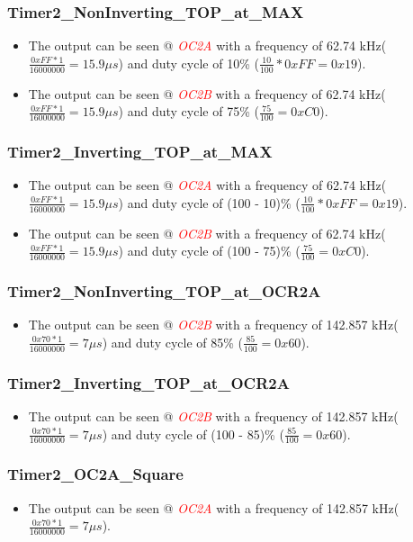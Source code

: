 \documentclass[oneside]{book}
\newcommand{\pinFormat}[1]{\emph{\textcolor{red}{#1}}}
\begin{document}
\subsubsection{Timer2\_NonInverting\_TOP\_at\_MAX}
\begin{itemize}
    \item The output can be seen @ \pinFormat{OC2A} with a frequency of 62.74 kHz($\frac{0xFF * 1}{16000000} = 15.9\mu s$) and duty cycle of 10\% ($\frac{10}{100} * 0xFF = 0x19$).
    \item The output can be seen @ \pinFormat{OC2B} with a frequency of 62.74 kHz($\frac{0xFF * 1}{16000000} = 15.9\mu s$) and duty cycle of 75\% ($\frac{75}{100} = 0xC0$).
\end{itemize}
\subsubsection{Timer2\_Inverting\_TOP\_at\_MAX}
\begin{itemize}
    \item The output can be seen @ \pinFormat{OC2A} with a frequency of 62.74 kHz($\frac{0xFF * 1}{16000000} = 15.9\mu s$) and duty cycle of (100 - 10)\% ($\frac{10}{100} * 0xFF = 0x19$).
    \item The output can be seen @ \pinFormat{OC2B} with a frequency of 62.74 kHz($\frac{0xFF * 1}{16000000} = 15.9\mu s$) and duty cycle of (100 - 75)\% ($\frac{75}{100} = 0xC0$).
\end{itemize}
\subsubsection{Timer2\_NonInverting\_TOP\_at\_OCR2A}
\begin{itemize}
    \item The output can be seen @ \pinFormat{OC2B} with a frequency of 142.857 kHz($\frac{0x70 * 1}{16000000} = 7\mu s$) and duty cycle of 85\% ($\frac{85}{100} = 0x60$).
\end{itemize}
\subsubsection{Timer2\_Inverting\_TOP\_at\_OCR2A}
\begin{itemize}
    \item The output can be seen @ \pinFormat{OC2B} with a frequency of 142.857 kHz($\frac{0x70 * 1}{16000000} = 7\mu s$) and duty cycle of (100 - 85)\% ($\frac{85}{100} = 0x60$).
\end{itemize}
\subsubsection{Timer2\_OC2A\_Square}
\begin{itemize}
    \item The output can be seen @ \pinFormat{OC2A} with a frequency of 142.857 kHz($\frac{0x70 * 1}{16000000} = 7\mu s$).
\end{itemize}
\end{document}
